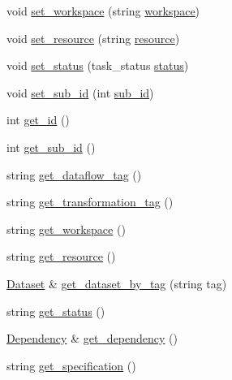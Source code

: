 \begin{DoxyCompactItemize}
void \hyperlink{classTask_aba1111f932df1f306dc581b51350fcac}{set\+\_\+workspace} (string \hyperlink{classTask_a9827ffbb7019894dffd2c27350613634}{workspace})
\item 
void \hyperlink{classTask_a60c02d44aeaae258738b5e65e945736b}{set\+\_\+resource} (string \hyperlink{classTask_af5b241fe56a17e15d824ac7b57501f72}{resource})
\item 
void \hyperlink{classTask_ac89f5349a2b63b6362a30f2488b39ad9}{set\+\_\+status} (task\+\_\+status \hyperlink{classTask_ae814b4785e245eb50a6b5a745408a271}{status})
\item 
void \hyperlink{classTask_a943ea609e9e335120a40ed8b3d2adad8}{set\+\_\+sub\+\_\+id} (int \hyperlink{classTask_aa5e5de369b641d4a6d66bd468d47b28b}{sub\+\_\+id})
\item 
int \hyperlink{classTask_a40694bba7094fa408d1bd2f6ffb1c2ae}{get\+\_\+id} ()
\item 
int \hyperlink{classTask_ac614b1c136949a316a3a18253df0121d}{get\+\_\+sub\+\_\+id} ()
\item 
string \hyperlink{classTask_a7ec0e1dbe84fcb2fd338d29efe22012f}{get\+\_\+dataflow\+\_\+tag} ()
\item 
string \hyperlink{classTask_ac0821d83651e5702218f7cb414888915}{get\+\_\+transformation\+\_\+tag} ()
\item 
string \hyperlink{classTask_a19596eec4c5c3d12b4bba38a66bf21c2}{get\+\_\+workspace} ()
\item 
string \hyperlink{classTask_a1275490d93daa52ade635a9121e0a5dd}{get\+\_\+resource} ()
\item 
\hyperlink{classDataset}{Dataset} \& \hyperlink{classTask_af540b03cc9ed9910200895bbc080e911}{get\+\_\+dataset\+\_\+by\+\_\+tag} (string tag)
\item 
string \hyperlink{classTask_ae350debd8a8397e2923a164af6508010}{get\+\_\+status} ()
\item 
\hyperlink{classDependency}{Dependency} \& \hyperlink{classTask_ae69363e2ebfc402468ea97d29c89653a}{get\+\_\+dependency} ()
\item 
string \hyperlink{classTask_a80fb64595e226c3501313e85290fcaf2}{get\+\_\+specification} ()
\end{DoxyCompactItemize}
